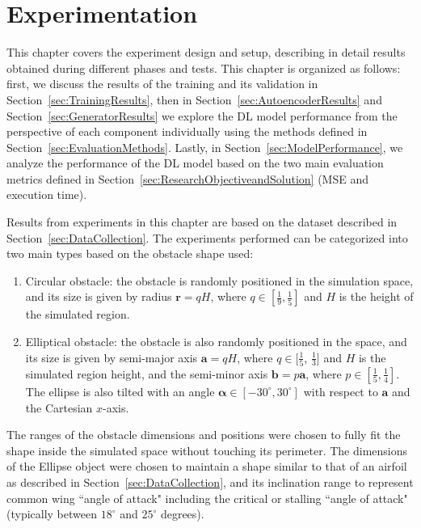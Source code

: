 
\chapter{Experimentation}
\label{ch:Experimentation}

This chapter covers the experiment design and setup, describing in detail results obtained during different phases and tests. This chapter is organized as follows: first, we discuss the results of the training and its validation in Section~\ref{sec:TrainingResults}, then in Section~\ref{sec:AutoencoderResults} and Section~\ref{sec:GeneratorResults} we explore the DL model performance from the perspective of each component individually using the methods defined in Section~\ref{sec:EvaluationMethods}.  Lastly, in Section~\ref{sec:ModelPerformance}, we analyze the performance of the DL model based on the two main evaluation metrics defined in Section~\ref{sec:ResearchObjectiveandSolution} (MSE and execution time).

Results from experiments in this chapter are based on the dataset described in Section~\ref{sec:DataCollection}. The experiments performed can be categorized into two main types based on the obstacle shape used:
\begin{enumerate}
    \item Circular obstacle: the obstacle is randomly positioned in the simulation space, and its size is given by radius $\textbf{r} = qH$, where $q \in [\frac{1}{9}, \frac{1}{5}]$ and $H$ is the height of the simulated region.
    
    \item Elliptical obstacle: the obstacle is also randomly positioned in the space, and its size is given by semi-major axis $\textbf{a}=qH$, where $q \in [\frac{1}{5}$, $\frac{1}{3}]$ and $H$ is the simulated region height, and the semi-minor axis $\textbf{b}=p\textbf{a}$, where $p \in [\frac{1}{5}, \frac{1}{4}]$. The ellipse is also tilted with an angle $\boldsymbol{\alpha} \in [-30^\circ, 30^\circ]$ with respect to $\textbf{a}$ and the Cartesian $x$-axis.
\end{enumerate}

The ranges of the obstacle dimensions and positions were chosen to fully fit the shape inside the simulated space without touching its perimeter. The dimensions of the Ellipse object were chosen to maintain a shape similar to that of an airfoil as described in Section~\ref{sec:DataCollection}, and its inclination range to represent common wing ``angle of attack" including the critical or stalling ``angle of attack" (typically between $18^\circ$ and $25^\circ$ degrees)\cite{abbott_ira_h_summary_1945}.


